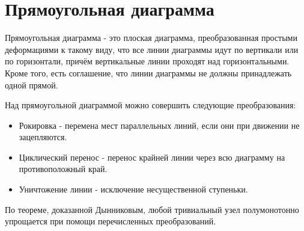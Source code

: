 \section{Прямоугольная диаграмма}
Прямоугольная диаграмма - это плоская диаграмма, преобразованная простыми деформациями к такому виду, что все линии диаграммы идут по вертикали или по горизонтали, причём вертикальные линии проходят над горизонтальными.
Кроме того, есть соглашение, что линии диаграммы не должны принадлежать одной прямой.

Над прямоугольной диаграммой можно совершить следующие преобразования:
\begin{itemize}
\item Рокировка - перемена мест параллельных линий, если они при движении не зацепляются.
\item Циклический перенос - перенос крайней линии через всю диаграмму на противоположный край.
\item Уничтожение линии - исключение несущественной ступеньки.
\end{itemize}

По теореме, доказанной Дынниковым, любой тривиальный узел полумонотонно упрощается при помощи перечисленных преобразований.
